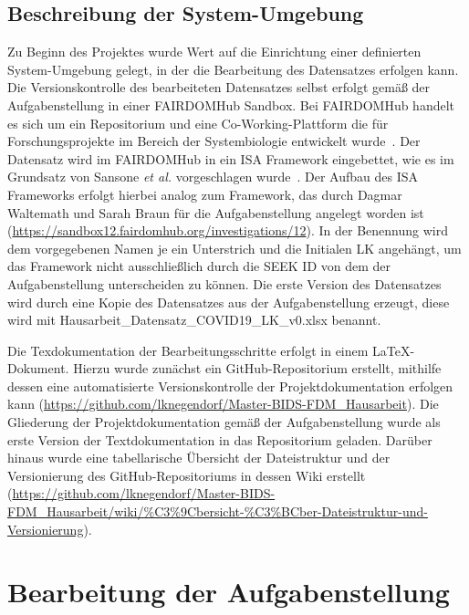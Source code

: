 \documentclass[12pt,a4paper,toc=bibliographynumbered,toc=indenttextentries]{scrreprt}
\begin{document}
		\section{Beschreibung der System-Umgebung}
		Zu Beginn des Projektes wurde Wert auf die Einrichtung einer definierten System-Umgebung gelegt, in der die Bearbeitung des Datensatzes erfolgen kann.
		Die Versionskontrolle des bearbeiteten Datensatzes selbst erfolgt gemäß der Aufgabenstellung in einer FAIRDOMHub Sandbox. Bei FAIRDOMHub handelt es sich um ein Repositorium und eine Co-Working-Plattform die für Forschungsprojekte im Bereich der Systembiologie entwickelt wurde~\cite{10.1093/nar/gkw1032}. Der Datensatz wird im FAIRDOMHub in ein ISA Framework eingebettet, wie es im Grundsatz von Sansone \textit{et al.} vorgeschlagen wurde~\cite{10.1038/ng.1054}. Der Aufbau des ISA Frameworks erfolgt hierbei analog zum Framework, das durch Dagmar Waltemath und Sarah Braun für die Aufgabenstellung angelegt worden ist (\url{https://sandbox12.fairdomhub.org/investigations/12}). In der Benennung wird dem vorgegebenen Namen je ein Unterstrich und die Initialen LK angehängt, um das Framework nicht ausschließlich durch die SEEK ID von dem der Aufgabenstellung unterscheiden zu können. Die erste Version des Datensatzes wird durch eine Kopie des Datensatzes aus der Aufgabenstellung erzeugt, diese wird mit \textsf{Hausarbeit\_Datensatz\_COVID19\_LK\_v0.xlsx} benannt.\par  
		Die Texdokumentation der Bearbeitungsschritte erfolgt in einem \LaTeX{}-Dokument. Hierzu wurde zunächst ein GitHub-Repositorium erstellt, mithilfe dessen eine automatisierte Versionskontrolle der Projektdokumentation erfolgen kann (\url{https://github.com/lknegendorf/Master-BIDS-FDM_Hausarbeit}). Die Gliederung der Projektdokumentation gemäß der Aufgabenstellung wurde als erste Version der Textdokumentation in das Repositorium geladen. Darüber hinaus wurde eine tabellarische Übersicht der Dateistruktur und der Versionierung des GitHub-Repositoriums in dessen Wiki erstellt (\url{https://github.com/lknegendorf/Master-BIDS-FDM_Hausarbeit/wiki/%C3%9Cbersicht-%C3%BCber-Dateistruktur-und-Versionierung}).  
		
	\chapter{Bearbeitung der Aufgabenstellung}
		
\end{document}
